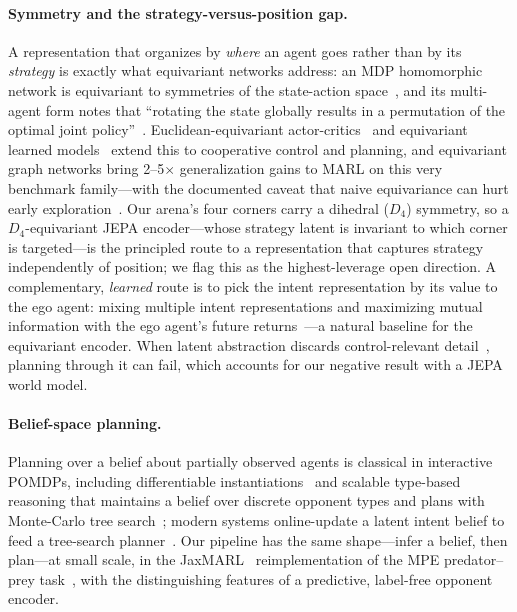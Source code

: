 \documentclass[11pt]{article}
\begin{document}
\paragraph{Symmetry and the strategy-versus-position gap.}
A representation that organizes by \emph{where} an agent goes rather than by its
\emph{strategy} is exactly what equivariant networks address: an MDP homomorphic
network is equivariant to symmetries of the state-action
space~\cite{vanderpol2020}, and its multi-agent form notes that ``rotating the
state globally results in a permutation of the optimal joint
policy''~\cite{vanderpol2021}. Euclidean-equivariant actor-critics~\cite{chen2023}
and equivariant learned models~\cite{equivmuzero2023} extend this to cooperative
control and planning, and equivariant graph networks bring 2--5$\times$
generalization gains to MARL on this very benchmark family---with the documented
caveat that naive equivariance can hurt early exploration~\cite{mcclellan2024e2gn2}.
Our arena's four corners carry a dihedral ($D_4$) symmetry,
so a $D_4$-equivariant JEPA encoder---whose strategy latent is invariant to which
corner is targeted---is the principled route to a representation that captures
strategy independently of position; we flag this as the highest-leverage open
direction. A complementary, \emph{learned} route is to pick the intent
representation by its value to the ego agent: mixing multiple intent
representations and maximizing mutual information with the ego agent's future
returns~\cite{odrowaz2026gim}---a natural baseline for the equivariant encoder. When latent abstraction discards control-relevant
detail~\cite{terver2025}, planning through it can fail, which accounts for our
negative result with a JEPA world model.

\paragraph{Belief-space planning.}
Planning over a belief about partially observed agents is classical in interactive
POMDPs, including differentiable instantiations~\cite{han2019} and scalable
type-based reasoning that maintains a belief over discrete opponent types and
plans with Monte-Carlo tree search~\cite{schwartz2023potmmcp}; modern systems
online-update a latent intent belief to feed a tree-search
planner~\cite{huang2024}. Our pipeline has the same shape---infer a belief, then
plan---at small scale, in the JaxMARL~\cite{jaxmarl} reimplementation of the MPE
predator--prey task~\cite{lowe2017}, with the distinguishing features of a
predictive, label-free opponent encoder.
\end{document}
